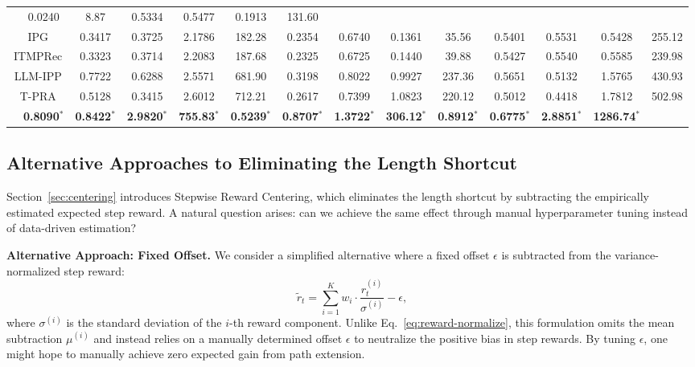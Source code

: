 \begin{table}[t]
{\begin{tabular}{c c cccc cccc cccc}
            & 0.0240 & 8.87 & 0.5334 & 0.5477 & 0.1913 & 131.60 \\
            \multicolumn{2}{c}{IPG}
            & 0.3417 & 0.3725 & 2.1786 & 182.28 & 0.2354 & 0.6740
            & 0.1361 & 35.56 & 0.5401 & 0.5531 & 0.5428 & 255.12 \\
            \multicolumn{2}{c}{ITMPRec}
            & 0.3323 & 0.3714 & 2.2083 & 187.68 & 0.2325 & 0.6725
            & 0.1440 & 39.88 & 0.5427 & 0.5540 & 0.5585 & 239.98 \\
            \multicolumn{2}{c}{LLM-IPP}
            & 0.7722 & 0.6288 & 2.5571 & 681.90 & 0.3198 & 0.8022
            & 0.9927 & 237.36 & 0.5651 & 0.5132 & 1.5765 & 430.93 \\
            \multicolumn{2}{c}{T-PRA}
            & 0.5128 & 0.3415 & 2.6012 & 712.21 & 0.2617 & 0.7399
            & 1.0823 & 220.12 & 0.5012 & 0.4418 & 1.7812 & 502.98 \\
        \hline
        \midrule
            \rowcolor{tableours}
            \multicolumn{2}{c}{\textbf{ProRL (Ours)}}
            & \textbf{0.8090}$^{*}$ & \textbf{0.8422}$^{*}$ & \textbf{2.9820}$^{*}$ & \textbf{755.83}$^{*}$ & \textbf{0.5239}$^{*}$ & \textbf{0.8707}$^{*}$ &
            \textbf{1.3722}$^{*}$ & \textbf{306.12}$^{*}$ & \textbf{0.8912}$^{*}$ & \textbf{0.6775}$^{*}$ & \textbf{2.8851}$^{*}$ & \textbf{1286.74}$^{*}$ \\
      \bottomrule[1.5pt]
      \end{tabular}
      }
\end{table}

\subsection{Alternative Approaches to Eliminating the Length Shortcut}
\label{app:alternatives}

Section~\ref{sec:centering} introduces Stepwise Reward Centering, which eliminates the length shortcut by subtracting the empirically estimated expected step reward. A natural question arises: can we achieve the same effect through manual hyperparameter tuning instead of data-driven estimation?

\textbf{Alternative Approach: Fixed Offset.} We consider a simplified alternative where a fixed offset $\epsilon$ is subtracted from the variance-normalized step reward:
\begin{equation}
\tilde{r}_t = \sum_{i=1}^{K} w_i \cdot \frac{r_t^{(i)}}{\sigma^{(i)}} - \epsilon,
\end{equation}
where $\sigma^{(i)}$ is the standard deviation of the $i$-th reward component. Unlike Eq.~\eqref{eq:reward-normalize}, this formulation omits the mean subtraction $\mu^{(i)}$ and instead relies on a manually determined offset $\epsilon$ to neutralize the positive bias in step rewards. By tuning $\epsilon$, one might hope to manually achieve zero expected gain from path extension.

